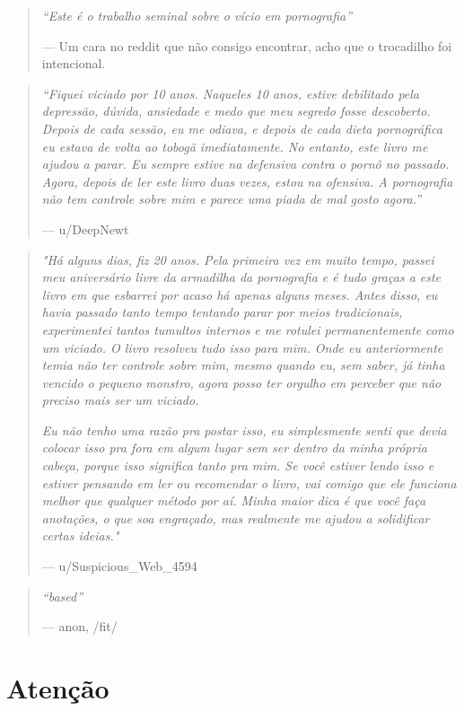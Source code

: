 \documentclass[
  spanish,
  openany]{book}
\begin{document}
\begin{quote}
\emph{``Este é o trabalho seminal sobre o vício em pornografia''}

--- Um cara no reddit que não consigo encontrar, acho que o trocadilho foi intencional.
\end{quote}

\begin{quote}
\emph{``Fiquei viciado por 10 anos. Naqueles 10 anos, estive debilitado pela depressão, dúvida, ansiedade e medo que meu segredo fosse descoberto. Depois de cada sessão, eu me odiava, e depois de cada dieta pornográfica eu estava de volta ao tobogã imediatamente. No entanto, este livro me ajudou a parar. Eu sempre estive na defensiva contra o pornô no passado. Agora, depois de ler este livro duas vezes, estou na ofensiva. A pornografia não tem controle sobre mim e parece uma piada de mal gosto agora.''}

--- u/DeepNewt
\end{quote}

\begin{quote}
\emph{"Há alguns dias, fiz 20 anos. Pela primeira vez em muito tempo, passei meu aniversário livre da armadilha da pornografia e é tudo graças a este livro em que esbarrei por acaso há apenas alguns meses. Antes disso, eu havia passado tanto tempo tentando parar por meios tradicionais, experimentei tantos tumultos internos e me rotulei permanentemente como um viciado. O livro resolveu tudo isso para mim. Onde eu anteriormente temia não ter controle sobre mim, mesmo quando eu, sem saber, já tinha vencido o pequeno monstro, agora posso ter orgulho em perceber que não preciso mais ser um viciado.}

\emph{Eu não tenho uma razão pra postar isso, eu simplesmente senti que devia colocar isso pra fora em algum lugar sem ser dentro da minha própria cabeça, porque isso significa tanto pra mim. Se você estiver lendo isso e estiver pensando em ler ou recomendar o livro, vai comigo que ele funciona melhor que qualquer método por aí. Minha maior dica é que você faça anotações, o que soa engraçado, mas realmente me ajudou a solidificar certas ideias."}

--- u/Suspicious\_Web\_4594
\end{quote}

\begin{quote}
\emph{``based''}

--- anon, /fit/
\end{quote}

\hypertarget{atenuxe7uxe3o}{%
\section{Atenção}\label{atenuxe7uxe3o}}
\end{document}
